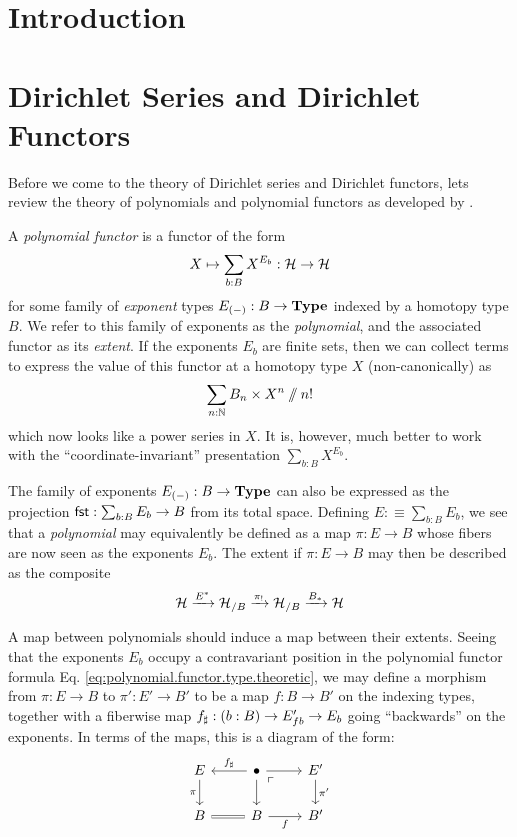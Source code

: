 \section{Introduction}


\section{Dirichlet Series and Dirichlet Functors}

Before we come to the theory of Dirichlet series and Dirichlet functors, lets
review the theory of polynomials and polynomial functors as developed by
\cite{GHK:Analytic.Monads}.

A \emph{polynomial functor} is a functor of the form
\begin{equation}\label{eq:polynomial.functor.type.theoretic}
X \mapsto \sum_{b : B}X^{E_b} : \operatorname{\mathcal{H}} \to \operatorname{\mathcal{H}}
\end{equation}
for some family of \emph{exponent} types $E_{(-)} : B \to \operatorname{\textbf{Type}}$ indexed by a
homotopy type $B$. We refer to this family of exponents as the
\emph{polynomial}, and the associated functor as its \emph{extent}. If the exponents $E_b$ are finite sets, then we can collect
terms to express the value of this functor at a homotopy type $X$ (non-canonically) as
$$\sum_{n : \operatorname{\mathbb{N}}} B_n \times X^n \mathbin{/\mkern-6mu/} n!$$
which now looks like a power series in $X$. It is, however, much better to work
with the ``coordinate-invariant'' presentation $\sum_{b : B} X^{E_b}$.

The family of exponents $E_{(-)} : B \to \operatorname{\textbf{Type}}$ can also be expressed as the
projection $\operatorname{\mathsf{{fst}}} : \sum_{b : B} E_b \to B$ from its total space. Defining $E
:\equiv \sum_{b : B} E_b$, we see that a \emph{polynomial} may equivalently be
defined as a map $\pi : E \to B$ whose fibers are now seen as the exponents
$E_b$. The extent if $\pi : E \to B$ may then be described as the composite
$$\operatorname{\mathcal{H}} \xrightarrow{E^{\ast}} \operatorname{\mathcal{H}}_{/B} \xrightarrow{\pi_{\operatorname{!}}} \operatorname{\mathcal{H}}_{/B} \xrightarrow{B_{\ast}} \operatorname{\mathcal{H}}$$

A map between polynomials should induce a map between their extents. Seeing that
the exponents $E_b$ occupy a contravariant position in the polynomial functor
formula Eq. \ref{eq:polynomial.functor.type.theoretic}, we may define a morphism
from $\pi : E \to B$ to $\pi' : E' \to B'$ to be a map $f : B \to B'$ on the
indexing types, together with a fiberwise map $f_{\sharp} : ({b : B}) \to E'_{f
  b} \to E_b$ going ``backwards'' on the exponents. In terms of the maps, this is a diagram of
the form:
\[
  \begin{tikzcd}
    E \arrow[d, "\pi"'] \arrow[r, leftarrow, "f_{\sharp}"] & \bullet \arrow[d] \arrow[r]
    \arrow[dr, phantom, "\ulcorner" very near start] & E' \arrow[d, "\pi'"] \\
    B \arrow[r, equals] & B \arrow[r, "f"'] & B'
  \end{tikzcd}
\]

